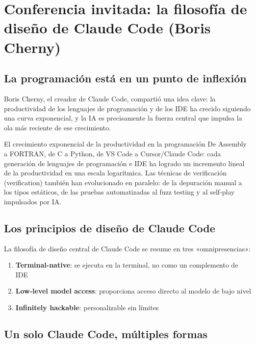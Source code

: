 \section{Conferencia invitada: la filosofía de diseño de Claude Code (Boris Cherny)}

\subsection{La programación está en un punto de inflexión}

Boris Cherny, el creador de Claude Code, compartió una idea clave: la productividad de los lenguajes de programación y de los IDE ha crecido siguiendo una curva exponencial, y la IA es precisamente la fuerza central que impulsa la ola más reciente de ese crecimiento.

\begin{knowledgebox}{El crecimiento exponencial de la productividad en la programación}
De Assembly a FORTRAN, de C a Python, de VS Code a Cursor/Claude Code: cada generación de lenguajes de programación e IDE ha logrado un incremento lineal de la productividad en una escala logarítmica. Las técnicas de verificación (verification) también han evolucionado en paralelo: de la depuración manual a los tipos estáticos, de las pruebas automatizadas al fuzz testing y al self-play impulsados por IA.
\end{knowledgebox}

\subsection{Los principios de diseño de Claude Code}

La filosofía de diseño central de Claude Code se resume en tres «omnipresencias»:

\begin{enumerate}
    \item \textbf{Terminal-native}: se ejecuta en la terminal, no como un complemento de IDE
    \item \textbf{Low-level model access}: proporciona acceso directo al modelo de bajo nivel
    \item \textbf{Infinitely hackable}: personalizable sin límites
\end{enumerate}

\subsection{Un solo Claude Code, múltiples formas}

